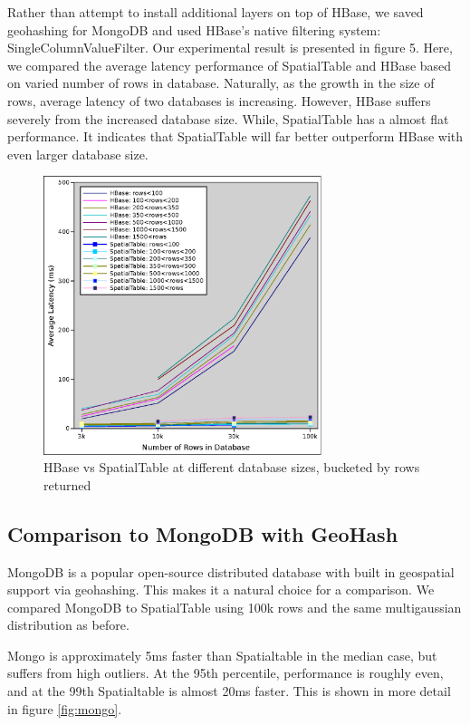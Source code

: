 \documentclass[11pt]{article}
\begin{document}
Rather than attempt to install additional layers on top of HBase, we saved geohashing for MongoDB and used HBase's native filtering system: SingleColumnValueFilter. Our experimental result is presented in figure 5. Here, we compared the average latency performance of SpatialTable and HBase based on varied number of rows in database. Naturally, as the growth in the size of rows, average latency of two databases is increasing. However, HBase suffers severely from the increased database size. While, SpatialTable has a almost flat performance. It indicates that SpatialTable will far better outperform HBase with even larger database size.

\begin{figure}[h]
\centering
\includegraphics[width=3.2in]{st_hbase}
\caption{HBase vs SpatialTable at different database sizes, bucketed by rows returned}
\label{fig:hb}
\end{figure}



\subsection{Comparison to MongoDB with GeoHash}

MongoDB is a popular open-source distributed database with built in geospatial support via geohashing.\cite{mongospatial1,mongospatial2}  This makes it a natural choice for a comparison.  We compared MongoDB to SpatialTable using 100k rows and the same multigaussian distribution as before.


Mongo is approximately 5ms faster than Spatialtable in the median case, but suffers from high outliers.   At the 95th percentile, performance is roughly even, and at the 99th Spatialtable is almost 20ms faster.  This is shown in more detail in figure \ref{fig:mongo}.
\end{document}
